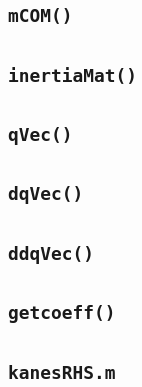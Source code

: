 \documentclass[a4paper,10pt]{article}
\begin{document}
\subsection{\texttt{mCOM()}}


\subsection{\texttt{inertiaMat()}}


\subsection{\texttt{qVec()}}


\subsection{\texttt{dqVec()}}


\subsection{\texttt{ddqVec()}}


\subsection{\texttt{getcoeff()}}


\subsection{\texttt{kanesRHS.m}}

\end{document}
